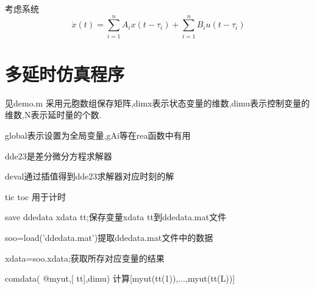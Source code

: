 \documentclass[11pt,a4paper]{ctexart}
\begin{document}
考虑系统
$$\dot{x}(t)=\sum_{i=1}^{n}A_ix(t-\tau_i)+\sum_{i=1}^{n}B_iu(t-\tau_i)$$


\section{多延时仿真程序}
见demo.m
采用元胞数组保存矩阵,dimx表示状态变量的维数,dimu表示控制变量的维数,N表示延时量的个数.

global表示设置为全局变量,gAi等在rea函数中有用

dde23是差分微分方程求解器

deval通过插值得到dde23求解器对应时刻的解

tic toc 用于计时


save ddedata xdata tt;保存变量xdata tt到ddedata.mat文件

soo=load('ddedata.mat')提取ddedata.mat文件中的数据

xdata=soo.xdata;获取所存对应变量的结果

comdata( @myut,[ tt],dimu) 计算[myut(tt(1)),...,myut(tt(L))]
 
\end{document}

